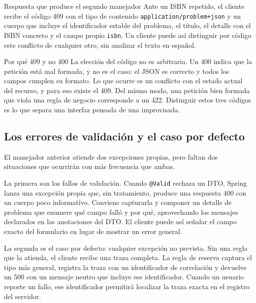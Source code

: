 \documentclass[11pt,a4paper,openany]{book}
\begin{document}
\begin{cajaejemplo}{Respuesta que produce el segundo manejador}
	Ante un ISBN repetido, el cliente recibe el código 409 con el tipo de contenido \texttt{application/problem+json} y un cuerpo que incluye el identificador estable del problema, el título, el detalle con el ISBN concreto y el campo propio \texttt{isbn}. Un cliente puede así distinguir por código este conflicto de cualquier otro, sin analizar el texto en español.
\end{cajaejemplo}

\begin{cajabuenas}{Por qué 409 y no 400}
	La elección del código no es arbitraria. Un 400 indica que la petición está mal formada, y no es el caso: el JSON es correcto y todos los campos cumplen su formato. Lo que ocurre es un conflicto con el estado actual del recurso, y para eso existe el 409. Del mismo modo, una petición bien formada que viola una regla de negocio corresponde a un 422. Distinguir estos tres códigos es lo que separa una interfaz pensada de una improvisada.
\end{cajabuenas}

\subsection{Los errores de validación y el caso por defecto}
\label{sec:validacion-errores}

El manejador anterior atiende dos excepciones propias, pero faltan dos situaciones que ocurrirán con más frecuencia que ambas.

La primera son los fallos de validación. Cuando \texttt{@Valid} rechaza un DTO, Spring lanza una excepción propia que, sin tratamiento, produce una respuesta 400 con un cuerpo poco informativo. Conviene capturarla y componer un detalle de problema que enumere qué campo falló y por qué, aprovechando los mensajes declarados en las anotaciones del DTO. El cliente puede así señalar el campo exacto del formulario en lugar de mostrar un error general.

La segunda es el caso por defecto: cualquier excepción no prevista. Sin una regla que la atienda, el cliente recibe una traza completa. La regla de reserva captura el tipo más general, registra la traza con un identificador de correlación y devuelve un 500 con un mensaje neutro que incluye ese identificador. Cuando un usuario reporte un fallo, ese identificador permitirá localizar la traza exacta en el registro del servidor.
\end{document}
